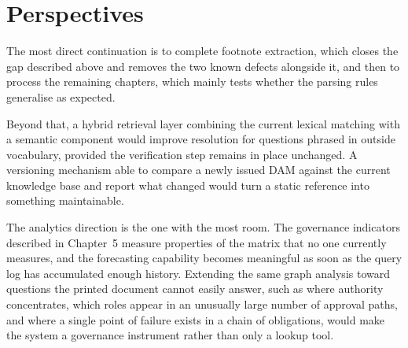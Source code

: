 \section*{Perspectives}

The most direct continuation is to complete footnote extraction, which closes the gap described above and removes the two known defects alongside it, and then to process the remaining chapters, which mainly tests whether the parsing rules generalise as expected.

Beyond that, a hybrid retrieval layer combining the current lexical matching with a semantic component would improve resolution for questions phrased in outside vocabulary, provided the verification step remains in place unchanged. A versioning mechanism able to compare a newly issued DAM against the current knowledge base and report what changed would turn a static reference into something maintainable.

The analytics direction is the one with the most room. The governance indicators described in Chapter~5 measure properties of the matrix that no one currently measures, and the forecasting capability becomes meaningful as soon as the query log has accumulated enough history. Extending the same graph analysis toward questions the printed document cannot easily answer, such as where authority concentrates, which roles appear in an unusually large number of approval paths, and where a single point of failure exists in a chain of obligations, would make the system a governance instrument rather than only a lookup tool.
